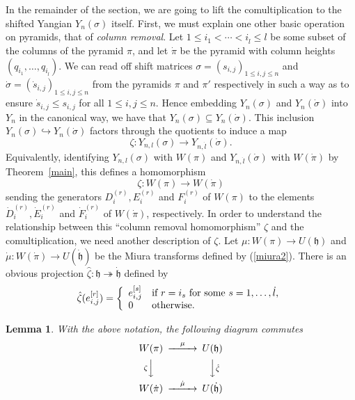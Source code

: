 \documentclass[twoside,12pt,reqno]{amsart}
\newtheorem{Lemma}[Proposition]{Lemma}
\begin{document}
In the remainder of the section, we are going to
lift the comultiplication 
to the shifted Yangian $Y_n(\sigma)$ itself.
First, we must explain one other basic operation
on pyramids, that of {\em column removal}.
Let
$1 \leq i_1 < \cdots < i_{\dot l} \leq l$ be some subset of the columns
of the pyramid $\pi$,
and let 
$\dot\pi$ be the pyramid with column heights
$(q_{i_1}, \dots, q_{i_{\dot l}})$.
We can read off shift matrices
$\sigma = (s_{i,j})_{1 \leq i,j \leq n}$ 
and $\dot\sigma = (\dot s_{i,j})_{1 \leq i,j \leq n}$
from the pyramids $\pi$ and $\pi'$ respectively
in such a way as to ensure $\dot s_{i,j} \leq s_{i,j}$
for all $1 \leq i,j \leq n$.
Hence embedding
$Y_n(\sigma)$ and $Y_n(\dot\sigma)$ into
$Y_n$ in the canonical way, we have that
$Y_n(\sigma) \subseteq Y_n(\dot\sigma)$.
This inclusion $Y_n(\sigma) \hookrightarrow Y_n(\dot\sigma)$
factors through the quotients to induce a map
\begin{equation}
\zeta:Y_{n,l}(\sigma) \rightarrow Y_{n,\dot l}(\dot\sigma).
\end{equation}
Equivalently, identifying
$Y_{n,l}(\sigma)$ with $W(\pi)$ and
$Y_{n,\dot l}(\dot\sigma)$ with $W(\dot\pi)$
by Theorem~\ref{main}, this defines a homomorphism
\begin{equation}
\zeta:W(\pi) \rightarrow W(\dot\pi)
\end{equation}
sending the generators $D_i^{(r)}, E_i^{(r)}$ and
$F_i^{(r)}$ of $W(\pi)$ 
to the elements
$\dot D_i^{(r)}, \dot E_i^{(r)}$
and $\dot F_i^{(r)}$ of $W(\dot\pi)$, respectively.
In order to understand the relationship between
this ``column removal homomorphism'' $\zeta$ and the comultiplication,
we need another description of $\zeta$.
Let $\mu:W(\pi) \rightarrow U(\mathfrak{h})$
and $\dot\mu:W(\dot\pi) \rightarrow U(\dot{\mathfrak{h}})$
be the Miura transforms defined by (\ref{miura2}).
There is an obvious projection
$\hat\zeta: \mathfrak{h} \twoheadrightarrow \dot{\mathfrak{h}}$
defined by
\begin{equation*}
\hat\zeta(e_{i,j}^{[r]}) =
\left\{
\begin{array}{ll}
e_{i,j}^{[s]}&\hbox{if $r = i_s$ for some $s=1,\dots,\dot l$,}\\
0&\hbox{otherwise.}
\end{array}
\right.
\end{equation*}

\begin{Lemma}\label{aftermu}
With the above notation, the following diagram commutes
$$
\begin{CD}
W(\pi) &@>\mu >> &U(\mathfrak{h}) \\
@V\zeta VV&&@VV\hat\zeta V\\
W(\dot\pi)&@>\dot\mu >> & U(\dot{\mathfrak{h}})
\end{CD}
$$
\end{Lemma}
\end{document}
